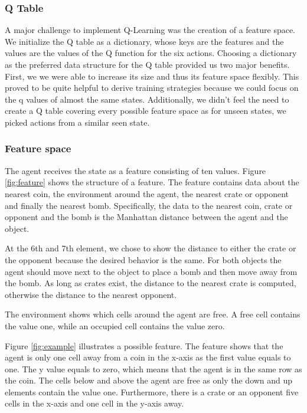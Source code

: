 \documentclass[
	letterpaper, %
	12pt, %
]{CSUniSchoolLabReport}
\begin{document}
\subsubsection{Q Table \AB}
A major challenge to implement Q-Learning was the creation of a feature space.
We initialize the Q table as a dictionary, whose keys are the features and the values are the values of the Q function for the six
actions.
Choosing a dictionary as the preferred data structure for the Q table provided us
two major benefits.
First, we we were able to increase its size and thus its feature space flexibly.
This proved to be quite helpful to derive training strategies because we
could focus on the q values of almost the same states.
Additionally, we didn't feel the need to create a Q table covering every possible
feature space as for unseen states, we picked actions from a similar seen state.

\subsubsection{Feature space \AB}
The agent receives the state as a feature consisting of ten values. Figure \ref{fig:feature} shows
the structure of a feature. The feature contains data about the nearest coin, the environment around
the agent, the nearest crate or opponent and finally the nearest bomb.
Specifically, the data to the nearest coin, crate or opponent and the bomb is the Manhattan distance
between the agent and the object.

At the 6th and 7th element, we chose to show the distance to either the crate or the opponent because
the desired behavior is the same. For both objects the agent should move next to the object to
place a bomb and then move away from the bomb. As long as crates exist, the distance to
the nearest crate is computed, otherwise the distance to the nearest opponent.

The environment shows which cells around the agent are free. A free cell contains the value one, while an occupied
cell contains the value zero.

Figure \ref{fig:example} illustrates a possible feature.
The feature shows that the agent is only one cell away from a coin in the x-axis as the first value equals to one.
The y value equals to zero, which means that the agent is in the same row as the coin. The cells below and above
the agent are free as only the down and up elements contain the value one. Furthermore, there is a crate or an opponent five cells in the x-axis
and one cell in the y-axis away.
\end{document}
